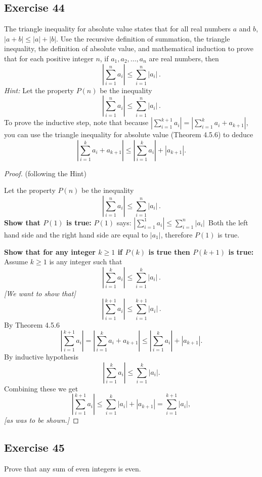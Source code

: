 \documentclass[14pt]{extarticle}
\begin{document}
\subsection{Exercise 44}
The triangle inequality for absolute value states that for all real numbers $a$ and $b$, $|a + b| \leq |a| + |b|$.
Use the recursive definition of summation, the triangle inequality, the definition of absolute value, and 
mathematical induction to prove that for each positive integer $n$, if $a_1, a_2, \ldots, a_n$ are real numbers, then
\[
\left|\sum_{i = 1}^{n} a_i \right| \leq \sum_{i = 1}^{n}|a_i|\,.
\]
{\it Hint:} Let the property $P(n)$ be the inequality
\[
\left|\sum_{i = 1}^{n} a_i \right| \leq \sum_{i = 1}^{n}|a_i|\,.
\]
To prove the inductive step, note that because \(|\sum_{i = 1}^{k + 1} a_i | = |\sum_{i = 1}^k a_i + a_{k + 1}|\), 
you can use the triangle inequality for absolute value (Theorem 4.5.6) to deduce 
\[
\left|\sum_{i = 1}^k a_i + a_{k + 1}\right| \leq \left|\sum_{i = 1}^k a_i\right| + |a_{k + 1}|.
\]
\begin{proof}
(following the Hint)

Let the property $P(n)$ be the inequality
\[
\left|\sum_{i = 1}^{n} a_i \right| \leq \sum_{i = 1}^{n}|a_i|\,.
\]
{\bf Show that $P(1)$ is true:} $P(1)$ says: \(\left|\sum_{i = 1}^{1} a_i \right| \leq \sum_{i = 1}^{n}|a_i|\,\)
Both the left hand side and the right hand side are equal to \(|a_1|\), therefore $P(1)$ is true.

{\bf Show that for any integer \(k \geq 1\) if $P(k)$ is true then $P(k+1)$ is true:}
Assume \(k \geq 1\) is any integer such that
\[
\left|\sum_{i = 1}^{k} a_i \right| \leq \sum_{i = 1}^{k}|a_i|\,.
\]
{\it [We want to show that]}
\[
\left|\sum_{i = 1}^{k+1} a_i \right| \leq \sum_{i = 1}^{k+1}|a_i|\,.
\]
By Theorem 4.5.6
\[
\left|\sum_{i = 1}^{k + 1} a_i \right| = \left|\sum_{i = 1}^k a_i + a_{k + 1}\right| \leq \left|\sum_{i = 1}^k a_i\right| + |a_{k + 1}|.
\]
By inductive hypothesis
\[
\left|\sum_{i = 1}^k a_i\right| \leq \sum_{i = 1}^k |a_i|.
\]
Combining these we get
\[
\left|\sum_{i = 1}^{k + 1} a_i \right| \leq \sum_{i = 1}^k |a_i| + |a_{k + 1}| = \sum_{i = 1}^{k+1} |a_i|,
\]
{\it [as was to be shown.]}
\end{proof}

\subsection{Exercise 45}
Prove that any sum of even integers is even.
\end{document}
